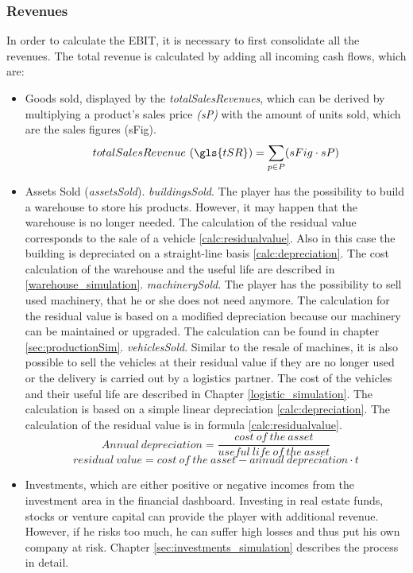 \subsubsection{Revenues}
In order to calculate the EBIT, it is necessary to first consolidate all the revenues. The total revenue is calculated by adding all incoming cash flows, which are:
\begin{itemize}
    \item Goods sold, displayed by the \textit{totalSalesRevenues}, which can be derived by multiplying a product’s sales price \textit{(sP)} with the amount of units sold, which are the sales figures (\gls{sFig}). 
    \begin{equation}
        totalSalesRevenue~(\gls{tSR}) = \sum_{p \in P}(sFig \cdot sP) 
    \end{equation}
    \item Assets Sold (\textit{assetsSold}). %
        \subitem \textit{buildingsSold}. The player has the possibility to build a warehouse to store his products. However, it may happen that the warehouse is no longer needed. The calculation of the residual value corresponds to the sale of a vehicle \ref{calc:residualvalue}. Also in this case the building is depreciated on a straight-line basis \ref{calc:depreciation}. The cost calculation of the warehouse and the useful life are described in \ref{warehouse_simulation}.
        \subitem \textit{machinerySold}. The player has the possibility to sell used machinery, that he or she does not need anymore. The calculation for the residual value is based on a modified depreciation because our machinery can be maintained or upgraded. The calculation can be found in chapter \ref{sec:productionSim}.
        \subitem \textit{vehiclesSold}. Similar to the resale of machines, it is also possible to sell the vehicles at their residual value if they are no longer used or the delivery is carried out by a logistics partner. The cost of the vehicles and their useful life are described in Chapter \ref{logistic_simulation}. The calculation is based on a simple linear depreciation \ref{calc:depreciation}. The calculation of the residual value is in formula \ref{calc:residualvalue}.
     \begin{equation}
     \label{calc:depreciation}
     Annual \ depreciation = {\dfrac{cost \ of \ the \ asset}{useful \ life \ of \ the \ asset}}
    \end{equation}
     \begin{equation}
     \label{calc:residualvalue}
     residual \ value = {{cost \ of \ the \ asset} - {annual \ depreciation \cdot t }}    
     \end{equation}  
    \item Investments, which are either positive or negative incomes from the investment area in the financial dashboard. Investing in real estate funds, stocks or venture capital can provide the player with additional revenue. However, if he risks too much, he can suffer high losses and thus put his own company at risk. Chapter \ref{sec:investments_simulation} describes the process in detail.
\end{itemize}

